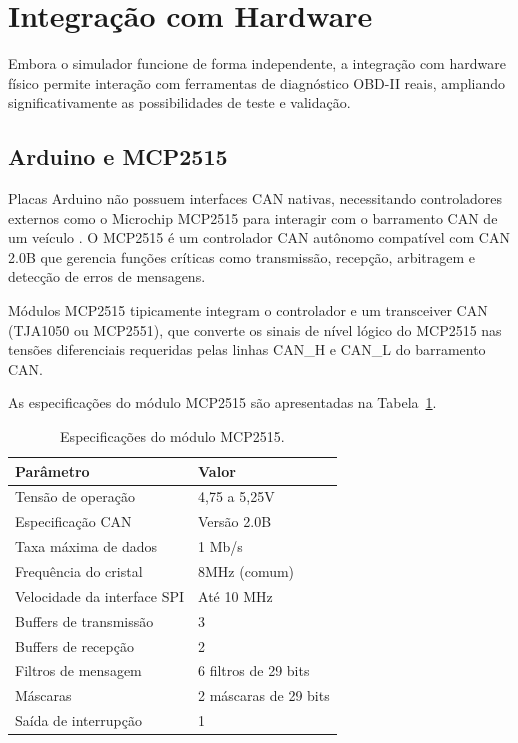 \section{Integração com Hardware}
\label{sec:hardware}

Embora o simulador funcione de forma independente, a integração com hardware físico permite interação com ferramentas de diagnóstico OBD-II reais, ampliando significativamente as possibilidades de teste e validação.

\subsection{Arduino e MCP2515}

Placas Arduino não possuem interfaces CAN nativas, necessitando controladores externos como o Microchip MCP2515 para interagir com o barramento CAN de um veículo \cite{mcp2515_datasheet}. O MCP2515 é um controlador CAN autônomo compatível com CAN 2.0B que gerencia funções críticas como transmissão, recepção, arbitragem e detecção de erros de mensagens.

Módulos MCP2515 tipicamente integram o controlador e um transceiver CAN (TJA1050 ou MCP2551), que converte os sinais de nível lógico do MCP2515 nas tensões diferenciais requeridas pelas linhas CAN\_H e CAN\_L do barramento CAN.

As especificações do módulo MCP2515 são apresentadas na Tabela~\ref{tab:mcp2515-specs}.

\begin{table}[H]
\centering
\caption{Especificações do módulo MCP2515.}
\label{tab:mcp2515-specs}
\begin{tabular}{@{}ll@{}}
\toprule
\textbf{Parâmetro} & \textbf{Valor} \\
\midrule
Tensão de operação & 4,75 a 5,25V \\
Especificação CAN & Versão 2.0B \\
Taxa máxima de dados & 1 Mb/s \\
Frequência do cristal & 8MHz (comum) \\
Velocidade da interface SPI & Até 10 MHz \\
Buffers de transmissão & 3 \\
Buffers de recepção & 2 \\
Filtros de mensagem & 6 filtros de 29 bits \\
Máscaras & 2 máscaras de 29 bits \\
Saída de interrupção & 1 \\
\bottomrule
\end{tabular}
\end{table}

